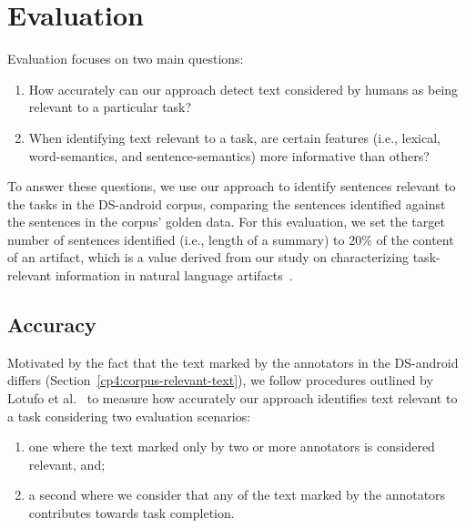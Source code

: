 \section{Evaluation}
\label{cp5:evaluation}


Evaluation focuses on two main questions:

\begin{enumerate}
    \item How accurately can our approach detect text considered by humans as being relevant to a particular task?
    
    \item When identifying text relevant to a task, are certain features (i.e., lexical, word-semantics, and sentence-semantics) more informative than others?
\end{enumerate}


To answer these questions, we use our approach to identify sentences relevant to
the tasks in the \acs{DS-android} corpus,
comparing the sentences identified against the 
sentences in the corpus' golden data. 
For this evaluation, we set the target number of sentences identified (i.e., length of a summary) to 20\% of the content of an artifact,
which is a value derived from our study on characterizing 
task-relevant information in natural language artifacts~\cite{marques2020}.





\subsection{Accuracy}


Motivated by the fact that the text marked by the annotators in the \acs{DS-android} differs
(Section~\ref{cp4:corpus-relevant-text}),
we follow procedures outlined by Lotufo et al.~\cite{Lotufo2012}
to measure how accurately our approach identifies text relevant to a task considering two evaluation scenarios:


\begin{enumerate}
    \item one where the text marked only by two or more annotators is considered relevant, and;
    
    \item a second where we consider that any of the text marked by the annotators contributes towards task completion.
\end{enumerate}




